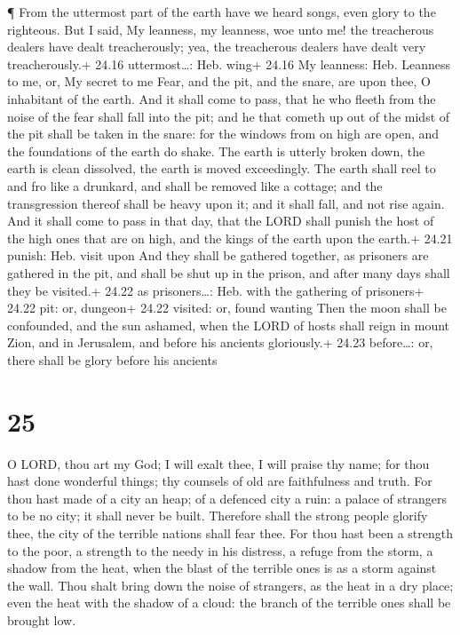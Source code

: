  ¶ From the uttermost part of the earth have we heard
songs, even glory to the righteous. But I said, My leanness, my
leanness, woe unto me! the treacherous dealers have dealt treacherously;
yea, the treacherous dealers have dealt very treacherously.+ 24.16
uttermost\ldots: Heb. wing+ 24.16 My leanness: Heb. Leanness to me, or,
My secret to me  Fear, and the pit, and the snare, are upon
thee, O inhabitant of the earth.  And it shall come to
pass, that he who fleeth from the noise of the fear shall fall into the
pit; and he that cometh up out of the midst of the pit shall be taken in
the snare: for the windows from on high are open, and the foundations of
the earth do shake.  The earth is utterly broken down, the
earth is clean dissolved, the earth is moved exceedingly. 
The earth shall reel to and fro like a drunkard, and shall be removed
like a cottage; and the transgression thereof shall be heavy upon it;
and it shall fall, and not rise again.  And it shall come
to pass in that day, that the LORD shall punish the host of the high
ones that are on high, and the kings of the earth upon the earth.+ 24.21
punish: Heb. visit upon  And they shall be gathered
together, as prisoners are gathered in the pit, and shall be shut up in
the prison, and after many days shall they be visited.+ 24.22 as
prisoners\ldots: Heb. with the gathering of prisoners+ 24.22 pit: or,
dungeon+ 24.22 visited: or, found wanting  Then the moon
shall be confounded, and the sun ashamed, when the LORD of hosts shall
reign in mount Zion, and in Jerusalem, and before his ancients
gloriously.+ 24.23 before\ldots: or, there shall be glory before his
ancients

\hypertarget{section-24}{%
\section{25}\label{section-24}}

 O LORD, thou art my God; I will exalt thee, I will praise
thy name; for thou hast done wonderful things; thy counsels of old are
faithfulness and truth.  For thou hast made of a city an
heap; of a defenced city a ruin: a palace of strangers to be no city; it
shall never be built.  Therefore shall the strong people
glorify thee, the city of the terrible nations shall fear thee.
 For thou hast been a strength to the poor, a strength to
the needy in his distress, a refuge from the storm, a shadow from the
heat, when the blast of the terrible ones is as a storm against the
wall.  Thou shalt bring down the noise of strangers, as the
heat in a dry place; even the heat with the shadow of a cloud: the
branch of the terrible ones shall be brought low.

